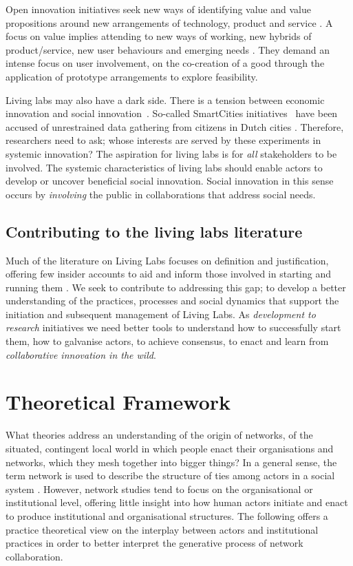 \documentclass[graybox]{styles/svmult}
\begin{document}
Open innovation initiatives seek new ways of identifying value and value propositions around new arrangements of technology, product and service \citep{Ayvari:2017aa}. 
A focus on value implies attending to new ways of working, new hybrids of product/service, new user behaviours and emerging needs \citep{bjorgvinsson2012agonistic}.
They demand an intense focus on user involvement, on the co-creation of a good through the application of prototype arrangements to explore feasibility.


Living labs may also have a dark side. 
There is a tension between economic innovation and social innovation~\citep{vasin2017challenge}. 
So-called SmartCities initiatives~\citep{schaffers2011smart} have been accused of unrestrained data gathering from citizens in Dutch cities \citep{Naa2018aa}. 
Therefore, researchers need to ask; whose interests are served by these experiments in systemic innovation?
The aspiration for living labs is for \textit{all} stakeholders to be involved.
The systemic characteristics of living labs should enable actors to develop or uncover beneficial social innovation.
Social innovation in this sense occurs by \textit{involving} the public in collaborations that address social needs.





\subsection{Contributing to the living labs literature}
Much of the literature on Living Labs focuses on definition and justification, offering few insider accounts to aid and inform those involved in starting and running them \citep{budweg2011enhancing}. 
We seek to contribute to addressing this gap; to develop a better understanding of the practices, processes and social dynamics that support the initiation and subsequent management of Living Labs.
As \textit{development to research} initiatives we need better tools to understand how to successfully start them, how to galvanise actors, to achieve consensus, to enact and learn from \textit{collaborative innovation in the wild}. 


\section{Theoretical Framework}
What theories address an understanding of the origin of networks, of the situated, contingent local world in which people enact their organisations and networks, which they mesh together into bigger things? In a general sense, the term network is used to describe the structure of ties among actors in a social system \citep[p. 288]{nohria1994networks}. However, network studies tend to focus on the organisational or institutional level, offering little insight into how human actors initiate and enact to produce institutional and organisational structures. 
The following offers a practice theoretical view on the interplay between actors and institutional practices in order to better interpret the generative process of network collaboration.
 
\end{document}
